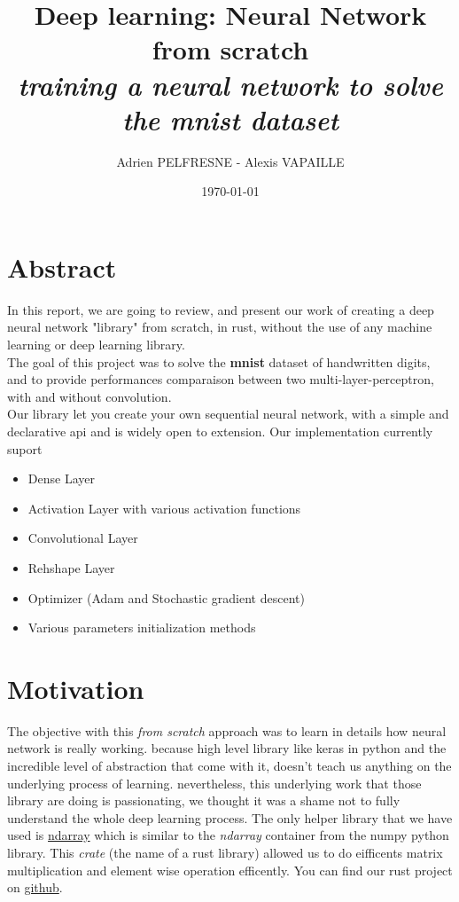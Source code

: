 \documentclass[a4paper, twocolumn, twoside]{article}
\title{Deep learning: Neural Network from scratch\\
\textit{training a neural network to solve the mnist dataset}}
\author{Adrien PELFRESNE - Alexis VAPAILLE}
\date{\today}
\begin{document}
	\onecolumn
    \maketitle
	\tableofcontents

	\section{Abstract}
	In this report, we are going to review, and present our work
	of creating a deep neural network "library" from scratch, in rust, without the use of any machine learning or deep learning library.\\
	The goal of this project was to solve the \textbf{mnist} dataset of handwritten digits, and to provide performances comparaison between
	two multi-layer-perceptron, with and without convolution.\\
	Our library let you create your own sequential neural network, with a simple and declarative api and is widely open to extension.
	Our implementation currently suport

	\begin{itemize}
		\item{Dense Layer}
		\item{Activation Layer with various activation functions}
		\item{Convolutional Layer}
		\item{Rehshape Layer}
		\item{Optimizer (Adam and Stochastic gradient descent)}
		\item{Various parameters initialization methods}
	\end{itemize}
	\twocolumn
	\clearpage

	\section{Motivation}
	The objective with this \textit{from scratch} approach was to learn in details how neural network is really working. because high level library like keras in python
	and the incredible level of abstraction that come with it, doesn't teach us anything on the underlying process of learning. nevertheless,
	this underlying work that those library are doing is passionating,
	we thought it was a shame not to fully understand the whole deep learning process.
	The only helper library that we have used is \href{https://crates.io/crates/ndarray}{ndarray} which is similar to the \textit{ndarray} container from the numpy python library.
	This \textit{crate} (the name of a rust library) allowed us to do eifficents matrix multiplication and element wise operation efficently.
	You can find our rust project on \href{https://github.com/dirdr/neural_network_from_scratch}{github}.
\end{document}
